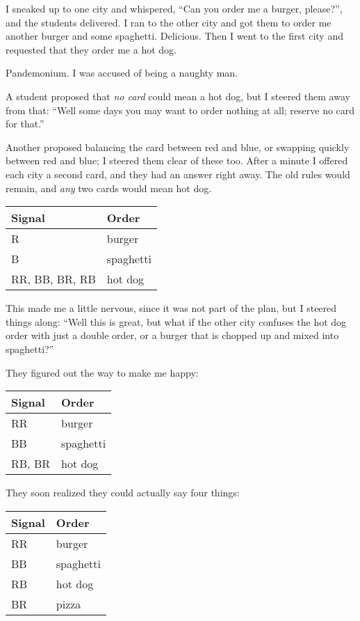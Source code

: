 \documentclass[sigplan,review]{acmart}
\begin{document}
I sneaked up to one city and whispered, ``Can you order me a burger, please?'', and the students delivered.
I ran to the other city and got them to order me another burger and some spaghetti. Delicious.
Then I went to the first city and requested that they order me a hot dog.

Pandemonium.
I was accused of being a naughty man.

A student proposed that \emph{no card} could mean a hot dog, but I steered them away from that: ``Well some days you may want to order nothing at all; reserve no card for that.''

Another proposed balancing the card between red and blue, or swapping quickly between red and blue; I steered them clear of these too.
After a minute I offered each city a second card, and they had an answer right away.
The old rules would remain, and \emph{any} two cards would mean hot dog.

\begin{table}[h]\sffamily
  \begin{tabular}{ll}
  Signal & Order \\
  \midrule
  R & burger \\
  B & spaghetti \\
  RR, BB, BR, RB & hot dog
  \end{tabular}
\end{table}

This made me a little nervous, since it was not part of the plan, but I steered things along:
``Well this is great, but what if the other city confuses the hot dog order with just a double order, or a burger that is chopped up and mixed into spaghetti?''

They figured out the way to make me happy:

\begin{table}[h]\sffamily
  \begin{tabular}{ll}
  Signal & Order \\
  \midrule
  RR & burger \\
  BB & spaghetti \\
  RB, BR & hot dog
  \end{tabular}
\end{table}

They soon realized they could actually say four things:

\begin{table}[h]\sffamily
  \begin{tabular}{ll}
  Signal & Order \\
  \midrule
  RR & burger \\
  BB & spaghetti \\
  RB & hot dog \\
  BR & pizza
  \end{tabular}
\end{table}
\end{document}
